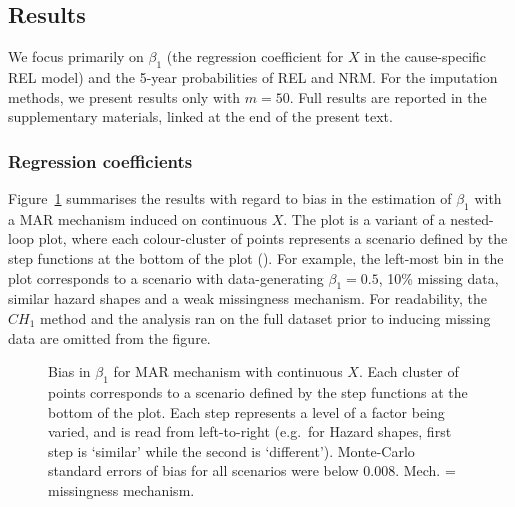 \documentclass[
  letterpaper,
  paper=240mm:170mm,
  twoside=true,
  open=right,
  fontsize=10pt,
  pagesize=false,
  BCOR=15mm,
  DIV=14,
  headinclude=true,
  footinclude=false,
  headsepline=on]{scrbook}
\begin{document}
\subsection{Results}\label{results-1}

We focus primarily on \(\beta_1\) (the regression coefficient for \(X\)
in the cause-specific REL model) and the 5-year probabilities of REL and
NRM. For the imputation methods, we present results only with
\(m = 50\). Full results are reported in the supplementary materials,
linked at the end of the present text.

\subsubsection{Regression coefficients}\label{regression-coefficients-1}

Figure~\ref{fig-beta1-MAR} summarises the results with regard to bias in
the estimation of \(\beta_1\) with a MAR mechanism induced on continuous
\(X\). The plot is a variant of a nested-loop plot, where each
colour-cluster of points represents a scenario defined by the step
functions at the bottom of the plot
(). For example, the left-most bin in the plot
corresponds to a scenario with data-generating \(\beta_1 = 0.5\), 10\%
missing data, similar hazard shapes and a weak missingness mechanism.
For readability, the \(CH_{1}\) method and the analysis ran on the full
dataset prior to inducing missing data are omitted from the figure.

\begin{figure}


\caption{\label{fig-beta1-MAR}Bias in \(\beta_1\) for MAR mechanism with
continuous \(X\). Each cluster of points corresponds to a scenario
defined by the step functions at the bottom of the plot. Each step
represents a level of a factor being varied, and is read from
left-to-right (e.g.~for Hazard shapes, first step is `similar' while the
second is `different'). Monte-Carlo standard errors of bias for all
scenarios were below 0.008. Mech. = missingness mechanism.}

\end{figure}%
\end{document}
